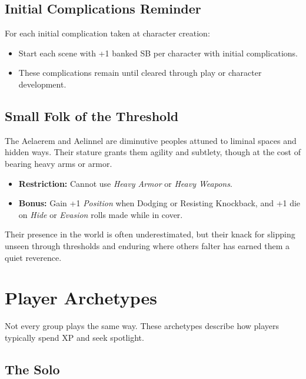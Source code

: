 \subsection{Initial Complications Reminder}\label{subsec:initial_complications}

For each initial complication taken at character creation:
\begin{itemize}
    \item Start each scene with +1 banked SB per character with initial complications.
    \item These complications remain until cleared through play or character development.
\end{itemize}

\subsection{Small Folk of the Threshold}\label{subsec:small_folk_threshold}

The Aelaerem and Aelinnel are diminutive peoples attuned to liminal spaces and hidden ways. Their stature grants them agility and subtlety, though at the cost of bearing heavy arms or armor.

\begin{itemize}
    \item \textbf{Restriction:} Cannot use \emph{Heavy Armor} or \emph{Heavy Weapons}.
    \item \textbf{Bonus:} Gain +1 \emph{Position} when Dodging or Resisting Knockback, and +1 die on \emph{Hide} or \emph{Evasion} rolls made while in cover.
\end{itemize}

Their presence in the world is often underestimated, but their knack for slipping unseen through thresholds and enduring where others falter has earned them a quiet reverence.

\section{Player Archetypes}\label{sec:player_archetypes}

Not every group plays the same way. These archetypes describe how players typically spend XP and seek spotlight.

\subsection{The Solo}\label{subsec:solo_archetype}

